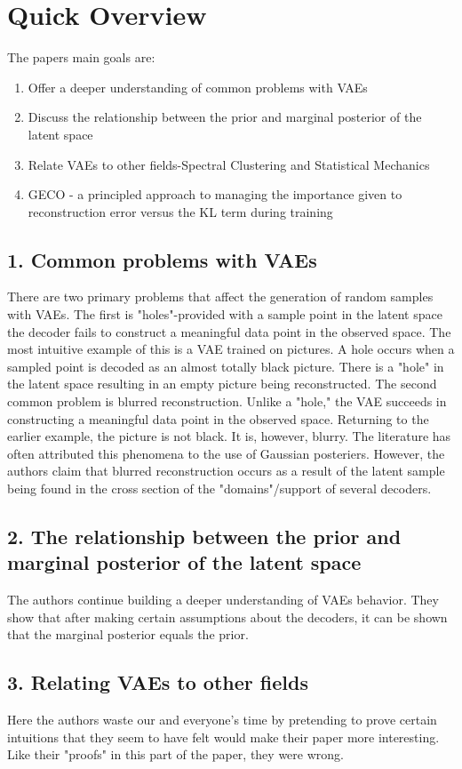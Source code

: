 \chapter*{Quick Overview}
The papers main goals are:
\begin{enumerate}
\item Offer a deeper understanding of common problems with VAEs
\item Discuss the relationship between the prior and marginal posterior of the latent space
\item Relate VAEs to other fields-Spectral Clustering and Statistical Mechanics
\item GECO - a principled approach to managing the importance given to reconstruction error versus the KL term during training
\end{enumerate}

\section*{1. Common problems with VAEs}
There are two primary problems that affect the generation of random samples with VAEs. The first is "holes"-provided with a sample point in the latent space the decoder fails to construct a meaningful data point in the observed space. The most intuitive example of this is a VAE trained on pictures. A hole occurs when a sampled point is decoded as an almost totally black picture. There is a "hole" in the latent space resulting in an empty picture being reconstructed.
The second common problem is blurred reconstruction. Unlike a "hole," the VAE succeeds in constructing a meaningful data point in the observed space. Returning to the earlier example, the picture is not black. It is, however, blurry. The literature has often attributed this phenomena to the use of Gaussian posteriers. However, the authors claim that blurred reconstruction occurs as a result of the latent sample being found in the cross section of the "domains"/support of several decoders. \\
\section*{2. The relationship between the prior and marginal posterior of the latent space}
The authors continue building a deeper understanding of VAEs behavior. They show that after making certain assumptions about the decoders, it can be shown that the marginal posterior equals the prior.
\section*{3. Relating VAEs to other fields}
Here the authors waste our and everyone's time by pretending to prove certain intuitions that they seem to have felt would make their paper more interesting. Like their "proofs" in this part of the paper, they were wrong.
